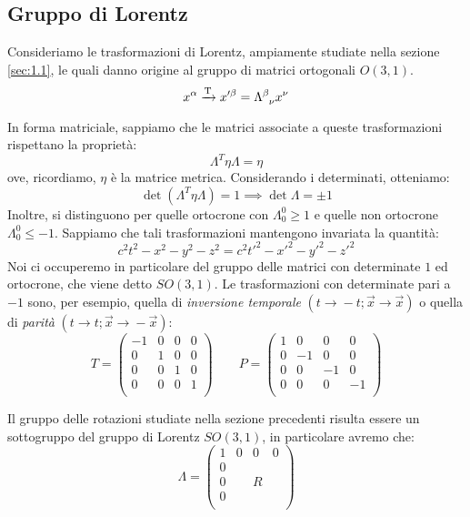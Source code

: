 \subsection{Gruppo di Lorentz}
Consideriamo le trasformazioni di Lorentz, ampiamente studiate nella sezione \ref{sec:1.1}, le quali danno origine al gruppo di matrici ortogonali $O(3,1)$.
\begin{equation}
  x^{\alpha}\xrightarrow[\text{}]{\text{T}}x'^{\beta}=\Lambda\indices{^\beta_\nu} x^{\nu}
\end{equation}
In forma matriciale, sappiamo che le matrici associate a queste trasformazioni rispettano la proprietà: 
\begin{equation}
\Lambda^T\eta\Lambda=\eta
\end{equation}
ove, ricordiamo, $\eta$ è la matrice metrica. Considerando i determinati, otteniamo:
\begin{equation}
\det(\Lambda^T\eta\Lambda)=1 \implies \det\Lambda=\pm1
\end{equation}
Inoltre, si distinguono per quelle ortocrone con $\Lambda^0_0\geq 1$ e quelle non ortocrone $\Lambda^0_0\leq -1$. Sappiamo che tali trasformazioni mantengono invariata la quantità:
\begin{equation}
    c^2t^2-x^2-y^2-z^2=  c^2t'^2-x'^2-y'^2-z'^2
\end{equation}
Noi ci occuperemo in particolare del gruppo delle matrici con determinate $1$ ed ortocrone, che viene detto $SO(3,1)$.
Le trasformazioni con determinate pari a $-1$ sono, per esempio, quella di \textit{inversione temporale} $(t\xrightarrow{}-t;\Vec{x}\xrightarrow{}\Vec{x})$ o quella di \textit{parità} $(t\xrightarrow{}t;\Vec{x}\xrightarrow{}-\Vec{x})$:
\begin{equation}
T= \begin{pmatrix}
  -1&0&0&0\\
0& 1&0&0 \\
0&0&1&0 \\
 0& 0&0&1\\
\end{pmatrix} \qquad P= \begin{pmatrix}
  1&0&0&0\\
0& -1&0&0 \\
0&0&-1&0 \\
 0& 0&0&-1\\
\end{pmatrix}
    \end{equation}

Il gruppo delle rotazioni studiate nella sezione precedenti risulta essere un sottogruppo del gruppo di Lorentz $SO(3,1)$, in particolare avremo che:
\begin{equation}
    \Lambda=\begin{pmatrix}
     1&0&0&0\\
     0&&&\\
      0&&R&\\
    0&&&\\
\end{pmatrix}
\end{equation}

